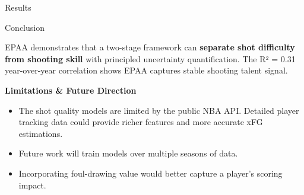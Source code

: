 \documentclass[final]{beamer}
\newlength{\onecolwid}
\begin{document}
\begin{frame}[t]
\begin{columns}[t,totalwidth=\textwidth]
\begin{column}{\onecolwid}
\begin{block}{Results}
\end{block}


\begin{block}{Conclusion}

EPAA demonstrates that a two-stage framework can \textbf{separate shot difficulty from shooting skill} with principled uncertainty quantification. The R² = 0.31 year-over-year correlation shows EPAA captures stable shooting talent signal.

\vspace{2ex}

\textbf{Limitations \& Future Direction}\\[0.5ex]
\begin{itemize}
\item The shot quality models are limited by the public NBA API. Detailed player tracking data could provide richer features and more accurate xFG estimations.
\item Future work will train models over multiple seasons of data. %
\item Incorporating foul-drawing value would better capture a player's scoring impact.
\end{itemize}

\end{block}




\end{column}
\end{columns}
\end{frame}
\end{document}
